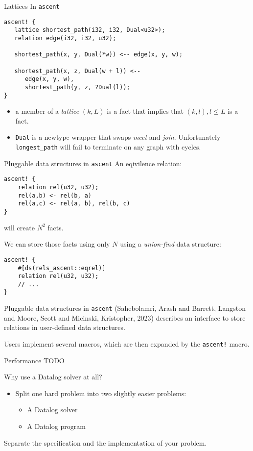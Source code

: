\documentclass[presentation]{beamer}
\begin{document}
\begin{frame}[label={sec:orgbadc3c1},fragile]{Lattices In \texttt{ascent}}
 \begin{verbatim}
ascent! {
   lattice shortest_path(i32, i32, Dual<u32>);
   relation edge(i32, i32, u32);

   shortest_path(x, y, Dual(*w)) <-- edge(x, y, w);

   shortest_path(x, z, Dual(w + l)) <--
      edge(x, y, w),
      shortest_path(y, z, ?Dual(l));
}
\end{verbatim}

\begin{itemize}
\item a member of a \emph{lattice} \((k, L)\) is a fact that implies that \((k,l), l \leq L\) is a fact.
\item \texttt{Dual} is a newtype wrapper that swaps \emph{meet} and \emph{join}. Unfortunately \texttt{longest\_path} will fail to terminate on any graph with cycles.
\end{itemize}
\end{frame}
\begin{frame}[label={sec:orge0142ed},fragile]{Pluggable data structures in \texttt{ascent}}
 An eqivilence relation:
\begin{verbatim}
ascent! {
    relation rel(u32, u32);
    rel(a,b) <- rel(b, a)
    rel(a,c) <- rel(a, b), rel(b, c)
}
\end{verbatim}
will create \(N^2\) facts.

We can store those facts using only \(N\) using a \emph{union-find} data structure:
\begin{verbatim}
ascent! {
    #[ds(rels_ascent::eqrel)]
    relation rel(u32, u32);
    // ...
}
\end{verbatim}
\end{frame}
\begin{frame}[label={sec:org339d530},fragile]{Pluggable data structures in \texttt{ascent}}
 (Sahebolamri, Arash and Barrett, Langston and Moore, Scott and Micinski, Kristopher, 2023) describes an interface to store relations in user-defined data structures.

Users implement several macros, which are then expanded by the \texttt{ascent!} macro.
\end{frame}
\begin{frame}[label={sec:orgeb6798e}]{Performance}
TODO
\end{frame}
\begin{frame}[label={sec:org8fc791a}]{Why use a Datalog solver at all?}
\begin{itemize}
\item Split one hard problem into two slightly easier problems:
\begin{itemize}
\item A Datalog solver
\item A Datalog program
\end{itemize}
\end{itemize}

Separate the specification and the implementation of your problem.
\end{frame}
\end{document}
